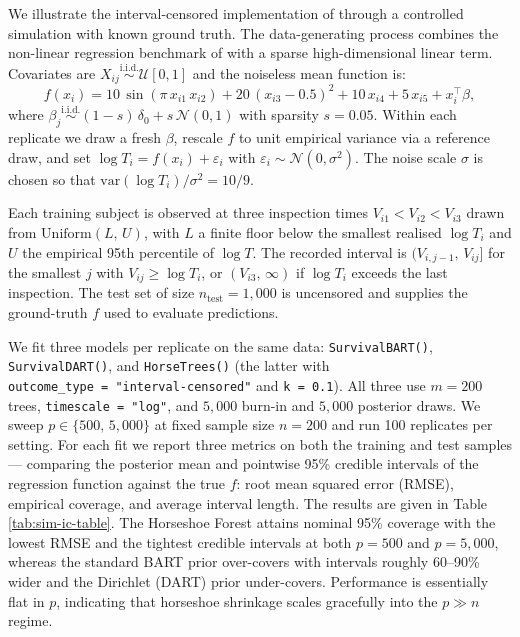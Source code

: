 We illustrate the interval-censored implementation of  through a controlled simulation with known ground truth. The data-generating process combines the non-linear regression benchmark of \citet{friedman1991mars} with a sparse high-dimensional linear term. Covariates are \(X_{ij} \overset{\text{i.i.d.}}{\sim} \mathcal{U}[0, 1]\) and the noiseless mean function is:
\[
f(x_i) = 10\, \sin(\pi\, x_{i1}\, x_{i2}) + 20\,(x_{i3} - 0.5)^2 + 10\, x_{i4} + 5\, x_{i5} + x_i^\top \beta,
\]
where \(\beta_j \overset{\text{i.i.d.}}{\sim} (1 - s)\, \delta_0 + s\, \mathcal{N}(0, 1)\) with sparsity \(s = 0.05\). Within each replicate we draw a fresh \(\beta\), rescale \(f\) to unit empirical variance via a reference draw, and set \(\log T_i = f(x_i) + \varepsilon_i\) with \(\varepsilon_i \sim \mathcal{N}(0, \sigma^2)\). The noise scale \(\sigma\) is chosen so that \(\text{var}(\log T_i) / \sigma^2 = 10/9\).

Each training subject is observed at three inspection times \(V_{i1} < V_{i2} < V_{i3}\) drawn from \(\text{Uniform}(L,\, U)\), with \(L\) a finite floor below the smallest realised \(\log T_i\) and \(U\) the empirical 95th percentile of \(\log T\). The recorded interval is \((V_{i,j-1},\, V_{ij}]\) for the smallest \(j\) with \(V_{ij} \ge \log T_i\), or \((V_{i3},\, \infty)\) if \(\log T_i\) exceeds the last inspection. The test set of size \(n_{\text{test}} = 1{,}000\) is uncensored and supplies the ground-truth \(f\) used to evaluate predictions.

We fit three models per replicate on the same data: \texttt{SurvivalBART()}, \texttt{SurvivalDART()}, and \texttt{HorseTrees()} (the latter with \texttt{outcome\_type\ =\ "interval-censored"} and \texttt{k\ =\ 0.1}). All three use \(m = 200\) trees, \texttt{timescale\ =\ "log"}, and \(5{,}000\) burn-in and \(5{,}000\) posterior draws. We sweep \(p \in \{500,\, 5{,}000\}\) at fixed sample size \(n = 200\) and run 100 replicates per setting. For each fit we report three metrics on both the training and test samples --- comparing the posterior mean and pointwise 95\% credible intervals of the regression function against the true \(f\): root mean squared error (RMSE), empirical coverage, and average interval length. The results are given in Table \ref{tab:sim-ic-table}. The Horseshoe Forest attains nominal 95\% coverage with the lowest RMSE and the tightest credible intervals at both \(p = 500\) and \(p = 5{,}000\), whereas the standard BART prior over-covers with intervals roughly 60--90\% wider and the Dirichlet (DART) prior under-covers. Performance is essentially flat in \(p\), indicating that horseshoe shrinkage scales gracefully into the \(p \gg n\) regime.

